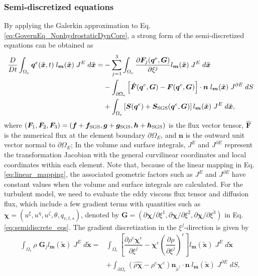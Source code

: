 \subsubsection{Semi-discretized equations}
By applying the Galerkin approximation to Eq.\,\eqref{eq:GovernEq_NonhydrostaticDynCore}, 
a strong form of the semi-discretized equations can be obtained as 
\begin{align}
  \dfrac{D}{Dt} \int_{\Omega_e} \bm{q}^e (\tilde{\bm{x}},t) \; l_{\bm{m}} (\tilde{\bm{x}}) \; J^E \; d\tilde{\bm{x}}
  = 
   &- \sum_{j=1}^3  
    \int_{\Omega_e} \dfrac{\partial \bm{F}_j (\bm{q}^e,\bm{G})}{\partial \xi^j}  l_{\bm{m}} (\tilde{\bm{x}}) \; J^E \; d\tilde{\bm{x}} \nonumber \\
   &- 
    \int_{\partial \Omega_{e}} \left[ \hat{\bm{F}} (\bm{q}^e,\bm{G}) - \bm{F}  (\bm{q}^e,\bm{G}) \right] \cdot \bm{n} \; l_{\bm{m}} (\tilde{\bm{x}}) \; J^{\partial E} \; dS  \nonumber \\
   &+ \int_{\Omega_{e}} \left[ \bm{S} (\bm{q}^e) + \bm{S}_{\rm SGS} (\bm{q}^e,\bm{G}) \right] l_{\bm{m}} (\tilde{\bm{x}}) \; J^E \; d\tilde{\bm{x}}, 
\label{eq:semidiscrete_eqs}
\end{align}
where $(\bm{F}_1,\bm{F}_2,\bm{F}_3)=(\bm{f}+\bm{f}_{\rm SGS},\bm{g}+\bm{g}_{\rm SGS},\bm{h}+\bm{h}_{\rm SGS})$ is the flux vector tensor, 
$\hat{\bm{F}}$ is the numerical flux at the element boundary $\partial\Omega_E$, 
and 
$\bm{n}$ is the outward unit vector normal to $\partial\Omega_E$; 
In the volume and surface integrals, 
$J^E$ and $J^{\partial E}$ represent the transformation Jacobian with the general curvilinear coordinates 
and local coordinates within each element. 
Note that, because of the linear mapping in Eq.\,\eqref{eq:linear_mapping}, 
the associated geometric factors such as $J^E$ and $J^{\partial E}$ have constant values  
when the volume and surface integrals are calculated. 
For the turbulent model,  
we need to evaluate 
the eddy viscous flux tensor and diffusion flux, 
which include a few gradient terms with quantities such as $\bm{\chi}=(u^\xi,u^\eta,u^\zeta,\theta,q_{v,l,s})$, 
denoted by 
$\bm{G}=(\partial \bm{\chi}/\partial\xi^1,\partial \bm{\chi}/\partial\xi^2,\partial \bm{\chi}/\partial\xi^3)$ 
in Eq.\,\eqref{eq:semidiscrete_eqs}. 
The gradient discretization in the $\xi^j$-direction is given by 
\begin{align}
  \int_{\Omega_e} \rho \; \bm{G}_j l_{\bm{m}} (\tilde{\bm{x}}) \; J^E \; d\tilde{\bm{x}}
  =  
  &  \int_{\Omega_e} \left[\dfrac{\partial \rho^e \bm{\chi}^e}{\partial \xi^j} - \bm{\chi}^e  \left(\dfrac{\partial \rho}{\partial \xi^j}\right)^e \right] l_{\bm{m}} (\tilde{\bm{x}}) \; J^E \; d\tilde{\bm{x}} \nonumber \\
  &+ \int_{\partial \Omega_{e}} \left( \widehat{\rho\bm{\chi}} - \rho^e \bm{\chi}^e \right)\bm{n}_{\tilde{x}^j}  \cdot \bm{n} \; l_{\bm{m}} (\tilde{\bm{x}}) \; J^{\partial E} \; dS, \label{eq:semidiscrete_grad}
\end{align}
